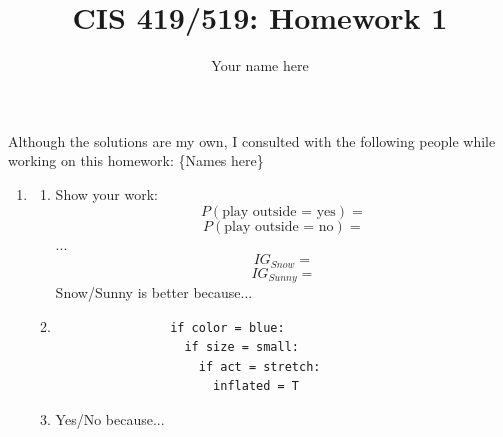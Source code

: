 \documentclass{article}
\title{CIS 419/519: Homework 1}
\author{Your name here}
\date{}
\begin{document}
    \maketitle
    Although the solutions are my own, I consulted with the following people while working on this homework: \{Names here\}

    \begin{enumerate}
        \item %
        \begin{enumerate}
            \item %
            Show your work:
            \begin{equation*}
                P(\textrm{play outside = yes}) =
            \end{equation*}
            \begin{equation*}
                P(\textrm{play outside = no}) =
            \end{equation*}
            ...
            \begin{equation*}
                IG_{Snow} =
            \end{equation*}
            \begin{equation*}
                IG_{Sunny} =
            \end{equation*}
            Snow/Sunny is better because...

            \item %
            \begin{verbatim}
                if color = blue:
                  if size = small:
                    if act = stretch:
                      inflated = T
            \end{verbatim}

            \item %
            Yes/No because...
        \end{enumerate}


\end{enumerate}
\end{document}
